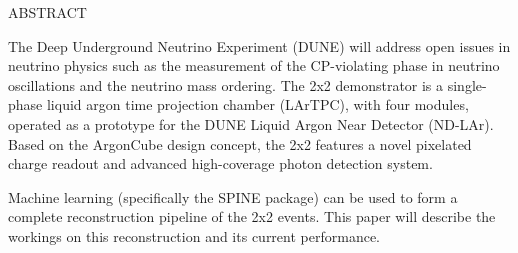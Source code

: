 \begin{doublespace}
\begin{tightcenter}
ABSTRACT
\mylinespacing
\end{tightcenter}

The Deep Underground Neutrino Experiment (DUNE) will address open issues in neutrino physics such as the measurement of the CP-violating phase in neutrino oscillations and the neutrino mass ordering.
The 2x2 demonstrator is a single-phase liquid argon time projection chamber (LArTPC), with four modules, operated as a prototype for the DUNE Liquid Argon Near Detector (ND-LAr).
Based on the ArgonCube design concept, the 2x2 features a novel pixelated charge readout and advanced high-coverage photon detection system.

Machine learning (specifically the SPINE package) can be used to form a complete reconstruction pipeline of the 2x2 events.
This paper will describe the workings on this reconstruction and its current performance.

\end{doublespace}

